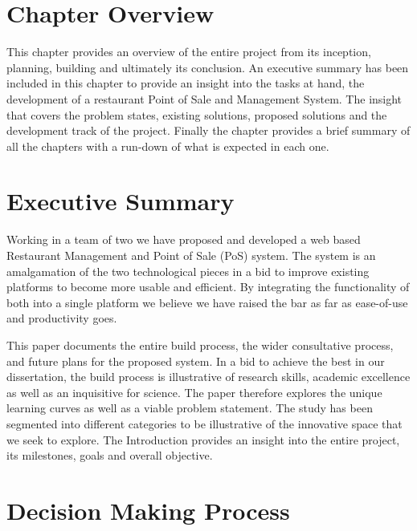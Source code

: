 \section{Chapter Overview}

This chapter provides an overview of the entire project from its inception, planning, building and ultimately its conclusion. An executive summary has been included in this chapter to provide an insight into the tasks at hand, the development of a restaurant Point of Sale and Management System. The insight that covers the problem states, existing solutions, proposed solutions and the development track of the project. Finally the chapter provides a brief summary of all the chapters with a run-down of what is expected in each one.  

\section{Executive Summary}

Working in a team of two we have proposed and developed a web based Restaurant Management and Point of Sale (PoS) system. The system is an amalgamation of the two technological pieces in a bid to improve existing platforms to become more usable and efficient. By integrating the functionality of both into a single platform we believe we have raised the bar as far as ease-of-use and productivity goes.\par

This paper documents the entire build process, the wider consultative process, and future plans for the proposed system. In a bid to achieve the best in our dissertation, the build process is illustrative of research skills, academic excellence as well as an inquisitive for science. The paper therefore explores the unique learning curves as well as a viable problem statement. The study has been segmented into different categories to be illustrative of the innovative space that we seek to explore. The Introduction provides an insight into the entire project, its milestones, goals and overall objective.  


\section{Decision Making Process}

